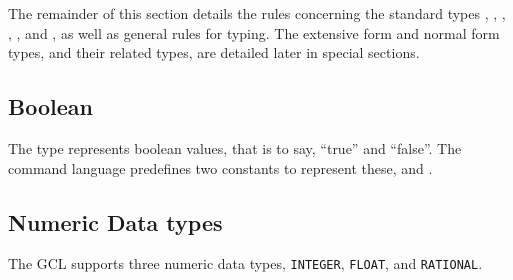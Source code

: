 The remainder of this section details the rules concerning the
standard types
, , , , ,
 and , as well as general rules for typing.
The extensive form and normal form types, and their related types, are
detailed later in special sections.


\subsection{Boolean}

The  type represents boolean values, that is to say,
``true'' and ``false''.  The command language predefines two constants
to represent these,  and .

\subsection{Numeric Data types}

The GCL supports three numeric data types, \verb+INTEGER+,
\verb+FLOAT+, and \verb+RATIONAL+.

